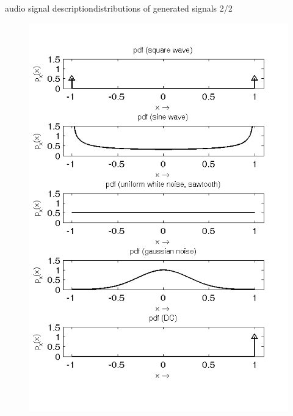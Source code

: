 \begin{frame}{audio signal description}{distributions of generated signals 2/2}
	\begin{figure}
		\centering
			\includegraphics[scale=.5]{graph/pdfs}
	\end{figure}
\end{frame}	
	
